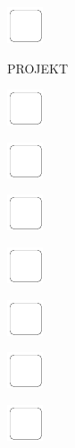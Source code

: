 \documentclass[11pt,titlepage]{article}
\begin{document}
\noindent
\includegraphics[]{checkbox-6mm.pdf}

\pagebreak

\small
\hfill PROJEKT

\vspace{6mm}

\noindent
\includegraphics[]{checkbox-6mm.pdf}

\vspace{12mm}

\noindent
\includegraphics[]{checkbox-6mm.pdf}

\vspace{12mm}

\noindent
\includegraphics[]{checkbox-6mm.pdf}

\vspace{12mm}

\noindent
\includegraphics[]{checkbox-6mm.pdf}

\vspace{12mm}

\noindent
\includegraphics[]{checkbox-6mm.pdf}

\vspace{12mm}

\noindent
\includegraphics[]{checkbox-6mm.pdf}

\vspace{12mm}

\noindent
\includegraphics[]{checkbox-6mm.pdf}
\end{document}

